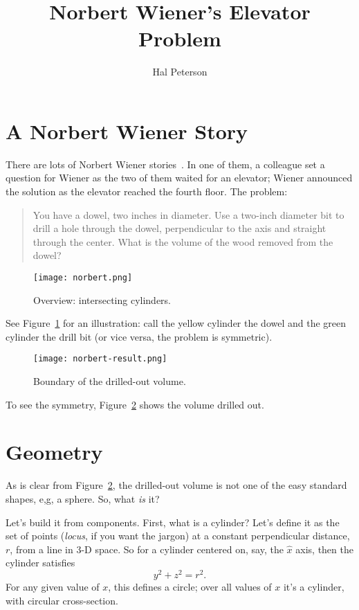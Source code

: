 \documentclass[twocolumn]{article}
\title{Norbert Wiener's Elevator Problem}
\author{Hal Peterson}
\theoremstyle{definition}
\theoremstyle{plain}
\begin{document}
\maketitle

\section{A Norbert Wiener Story}

There are lots of Norbert Wiener stories~\cite{Hardesty2021}.  In one
of them, a colleague 
set a question for Wiener as the two of them waited for an elevator;
Wiener announced the solution as the elevator reached the fourth
floor.  The problem:
\begin{quotation}
  You have a dowel, two inches in diameter.  Use a two-inch diameter
  bit to drill a hole through the dowel, perpendicular to the axis and
  straight through the center.  What is the volume of the wood removed
  from the dowel?
\end{quotation}

\begin{figure}
  \texttt{[image: norbert.png]}
  \caption{Overview:  intersecting cylinders.}
  \label{fig:overview}
\end{figure}

See Figure~\ref{fig:overview} for an illustration:  call the yellow
cylinder the dowel and the green cylinder the drill bit (or vice
versa, the problem is symmetric).

\begin{figure}
  \texttt{[image: norbert-result.png]}
  \caption{Boundary of the drilled-out volume.}
  \label{fig:boundary}
\end{figure}

To see the symmetry, Figure~\ref{fig:boundary} shows the volume
drilled out.

\section{Geometry}

As is clear from Figure~\ref{fig:boundary}, the drilled-out volume is
not one of the easy standard shapes, e,g, a sphere.  So, what
\emph{is} it?

Let's build it from components.  First, what is a cylinder?  Let's
define it as the set of points (\emph{locus}, if you want the jargon)
at a constant perpendicular distance, $r$, from a line in 3-D space.
So for a cylinder centered on, say, the $\hat{x}$ axis, then the
cylinder satisfies
\begin{equation}
  y^2 + z^2 = r^2.
\end{equation}
\label{eq:cylinder}
For any given value of $x$, this defines a circle; over all values of
$x$ it's a cylinder, with circular cross-section.
\end{document}
